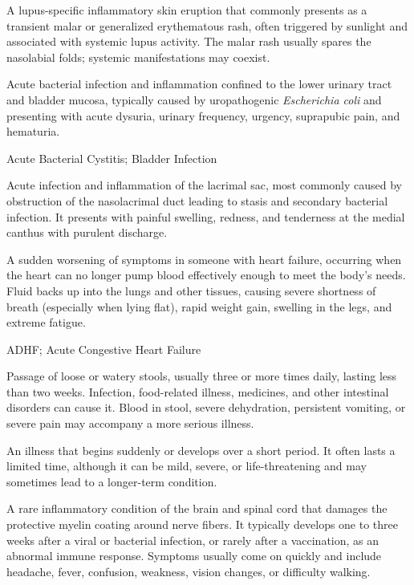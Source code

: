  A lupus-specific inflammatory skin eruption that commonly presents as a transient malar or generalized erythematous rash, often triggered by sunlight and associated with systemic lupus activity. The malar rash usually spares the nasolabial folds; systemic manifestations may coexist.

 Acute bacterial infection and inflammation confined to the lower urinary tract and bladder mucosa, typically caused by uropathogenic \textit{Escherichia coli} and presenting with acute dysuria, urinary frequency, urgency, suprapubic pain, and hematuria.

\synonyms
Acute Bacterial Cystitis; Bladder Infection

 Acute infection and inflammation of the lacrimal sac, most commonly caused by
obstruction of the nasolacrimal duct leading to stasis and secondary bacterial
infection. It presents with painful swelling, redness, and tenderness at the medial
canthus with purulent discharge.

 A sudden worsening of symptoms in someone with heart failure, occurring when the heart can no longer pump blood effectively enough to meet the body's needs. Fluid backs up into the lungs and other tissues, causing severe shortness of breath (especially when lying flat), rapid weight gain, swelling in the legs, and extreme fatigue.

\synonyms
ADHF; Acute Congestive Heart Failure

 Passage of loose or watery stools, usually three or more times daily, lasting less than two weeks. Infection, food-related
illness, medicines, and other intestinal disorders can cause it. Blood in stool, severe dehydration, persistent vomiting,
or severe pain may accompany a more serious illness.

 An illness that begins suddenly or develops over a short period. It often lasts a limited time, although it can be mild, severe, or life-threatening and may sometimes lead to a longer-term condition.

 A rare inflammatory condition of the brain and spinal cord that damages the protective myelin coating around nerve fibers. It typically develops one to three weeks after a viral or bacterial infection, or rarely after a vaccination, as an abnormal immune response. Symptoms usually come on quickly and include headache, fever, confusion, weakness, vision changes, or difficulty walking.

